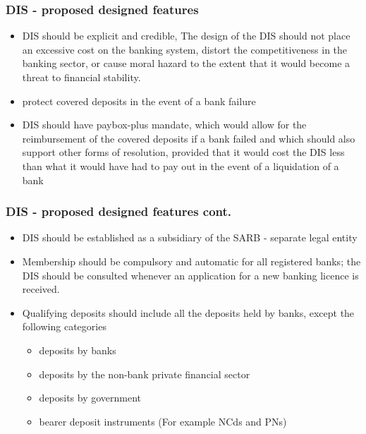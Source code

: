 \documentclass[11pt]{beamer}
\begin{document}
\begin{frame}
\frametitle{DIS - proposed designed features}
\begin{itemize}
\item DIS should be explicit and credible, The design of the DIS should not place an excessive cost on the banking system, distort the competitiveness in the banking sector, or cause moral hazard to the extent that it would become a threat to financial stability.
\item protect covered deposits in the event of a bank failure
\item DIS should have paybox-plus mandate, which would allow for the reimbursement of the covered deposits if a bank failed and which should also support other forms of resolution, provided that it would cost the DIS less than what it would have had to pay out in the event of a liquidation of a bank
\end{itemize}
\end{frame}



\begin{frame}
\frametitle{DIS - proposed designed features cont.}
\begin{itemize}
\item DIS should be established as a subsidiary of the SARB - separate legal entity
\item Membership should be compulsory and automatic for all registered banks; the DIS should be consulted whenever an application for a new banking licence is received.
\item Qualifying deposits should include all the deposits held by banks, except the following categories
\begin{itemize}
\item deposits by banks
\item deposits by the non-bank private financial sector
\item deposits by government
\item bearer deposit instruments (For example NCds and PNs)
\end{itemize}
\end{itemize}
\end{frame}
\end{document}
